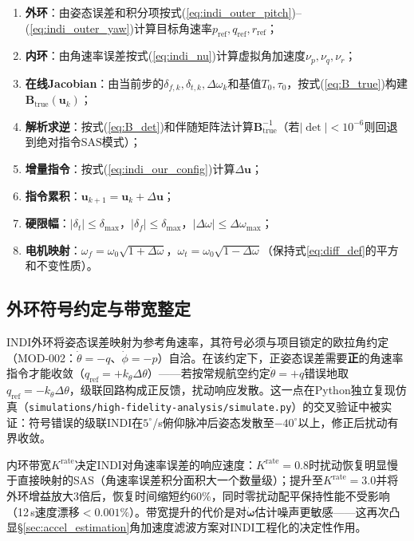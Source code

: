 \begin{enumerate}[label=(\arabic*)]
    \item \textbf{外环}：由姿态误差和积分项按式(\ref{eq:indi_outer_pitch})--(\ref{eq:indi_outer_yaw})计算目标角速率$p_{\text{ref}},q_{\text{ref}},r_{\text{ref}}$；
    \item \textbf{内环}：由角速率误差按式(\ref{eq:indi_nu})计算虚拟角加速度$\nu_p,\nu_q,\nu_r$；
    \item \textbf{在线Jacobian}：由当前步的$\delta_{f,k},\delta_{t,k},\Delta\omega_k$和基值$T_0,\tau_0$，按式(\ref{eq:B_true})构建$\mathbf{B}_{\mathrm{true}}(\mathbf{u}_k)$；
    \item \textbf{解析求逆}：按式(\ref{eq:B_det})和伴随矩阵法计算$\mathbf{B}_{\mathrm{true}}^{-1}$（若$|\det|<10^{-6}$则回退到绝对指令SAS模式）；
    \item \textbf{增量指令}：按式(\ref{eq:indi_our_config})计算$\Delta\mathbf{u}$；
    \item \textbf{指令累积}：$\mathbf{u}_{k+1} = \mathbf{u}_k + \Delta\mathbf{u}$；
    \item \textbf{硬限幅}：$|\delta_t|\leq\delta_{\max}$，$|\delta_f|\leq\delta_{\max}$，$|\Delta\omega|\leq\Delta\omega_{\max}$；
    \item \textbf{电机映射}：$\omega_f=\omega_0\sqrt{1+\Delta\omega}$，$\omega_t=\omega_0\sqrt{1-\Delta\omega}$（保持式\ref{eq:diff_def}的平方和不变性质）。
\end{enumerate}

\subsection{外环符号约定与带宽整定}
\label{sec:indi_outer_sign}

INDI外环将姿态误差映射为参考角速率，其符号必须与项目锁定的欧拉角约定（MOD-002：$\dot\theta=-q$、$\dot\phi=-p$）自洽。在该约定下，正姿态误差需要\textbf{正}的角速率指令才能收敛（$q_{\text{ref}}=+k_\theta\Delta\theta$）——若按常规航空约定$\dot\theta=+q$错误地取$q_{\text{ref}}=-k_\theta\Delta\theta$，级联回路构成正反馈，扰动响应发散。这一点在Python独立复现仿真（\texttt{simulations/}\allowbreak\texttt{high-fidelity-analysis/}\allowbreak\texttt{simulate.py}）的交叉验证中被实证：符号错误的级联INDI在$5^\circ$/s俯仰脉冲后姿态发散至$-40^\circ$以上，修正后扰动有界收敛。

内环带宽$K^{\text{rate}}$决定INDI对角速率误差的响应速度：$K^{\text{rate}}=0.8$时扰动恢复明显慢于直接映射的SAS（角速率误差积分面积大一个数量级）；提升至$K^{\text{rate}}=3.0$并将外环增益放大3倍后，恢复时间缩短约60\%，同时零扰动配平保持性能不受影响（12\,s速度漂移$<0.001\%$）。带宽提升的代价是对$\dot{\boldsymbol{\omega}}$估计噪声更敏感——这再次凸显§\ref{sec:accel_estimation}角加速度滤波方案对INDI工程化的决定性作用。

